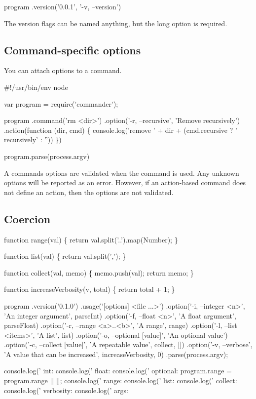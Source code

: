 \begin{DoxyCode}
program
  .version('0.0.1', '-v, --version')
\end{DoxyCode}


The version flags can be named anything, but the long option is required.

\subsection*{Command-\/specific options}

You can attach options to a command.


\begin{DoxyCode}
#!/usr/bin/env node

var program = require('commander');

program
  .command('rm <dir>')
  .option('-r, --recursive', 'Remove recursively')
  .action(function (dir, cmd) \{
    console.log('remove ' + dir + (cmd.recursive ? ' recursively' : ''))
  \})

program.parse(process.argv)
\end{DoxyCode}


A command\textquotesingle{}s options are validated when the command is used. Any unknown options will be reported as an error. However, if an action-\/based command does not define an action, then the options are not validated.

\subsection*{Coercion}


\begin{DoxyCode}
function range(val) \{
  return val.split('..').map(Number);
\}

function list(val) \{
  return val.split(',');
\}

function collect(val, memo) \{
  memo.push(val);
  return memo;
\}

function increaseVerbosity(v, total) \{
  return total + 1;
\}

program
  .version('0.1.0')
  .usage('[options] <file ...>')
  .option('-i, --integer <n>', 'An integer argument', parseInt)
  .option('-f, --float <n>', 'A float argument', parseFloat)
  .option('-r, --range <a>..<b>', 'A range', range)
  .option('-l, --list <items>', 'A list', list)
  .option('-o, --optional [value]', 'An optional value')
  .option('-c, --collect [value]', 'A repeatable value', collect, [])
  .option('-v, --verbose', 'A value that can be increased', increaseVerbosity, 0)
  .parse(process.argv);

console.log(' int: %
console.log(' float: %
console.log(' optional: %
program.range = program.range || [];
console.log(' range: %
console.log(' list: %
console.log(' collect: %
console.log(' verbosity: %
console.log(' args: %
\end{DoxyCode}


